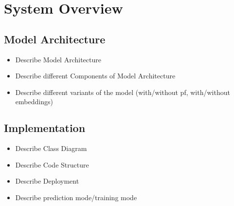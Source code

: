 \chapter{System Overview}

\section{Model Architecture}
\begin{itemize}
\item Describe Model Architecture
\item Describe different Components of Model Architecture
\item Describe different variants of the model (with/without pf, with/without embeddings)
\end{itemize}

\section{Implementation}
\begin{itemize}
\item Describe Class Diagram
\item Describe Code Structure
\item Describe Deployment
\item Describe prediction mode/training mode
\end{itemize}